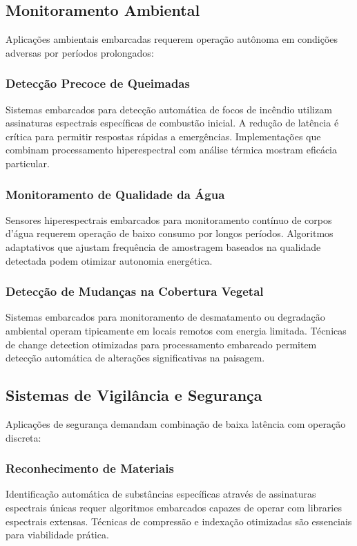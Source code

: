 \subsection{Monitoramento Ambiental}
Aplicações ambientais embarcadas requerem operação autônoma em condições adversas por períodos prolongados:

\subsubsection{Detecção Precoce de Queimadas}
Sistemas embarcados para detecção automática de focos de incêndio utilizam assinaturas espectrais específicas de combustão inicial. A redução de latência é crítica para permitir respostas rápidas a emergências. Implementações que combinam processamento hiperespectral com análise térmica mostram eficácia particular.

\subsubsection{Monitoramento de Qualidade da Água}
Sensores hiperespectrais embarcados para monitoramento contínuo de corpos d'água requerem operação de baixo consumo por longos períodos. Algoritmos adaptativos que ajustam frequência de amostragem baseados na qualidade detectada podem otimizar autonomia energética.

\subsubsection{Detecção de Mudanças na Cobertura Vegetal}
Sistemas embarcados para monitoramento de desmatamento ou degradação ambiental operam tipicamente em locais remotos com energia limitada. Técnicas de change detection otimizadas para processamento embarcado permitem detecção automática de alterações significativas na paisagem.

\subsection{Sistemas de Vigilância e Segurança}
Aplicações de segurança demandam combinação de baixa latência com operação discreta:

\subsubsection{Reconhecimento de Materiais}
Identificação automática de substâncias específicas através de assinaturas espectrais únicas requer algoritmos embarcados capazes de operar com libraries espectrais extensas. Técnicas de compressão e indexação otimizadas são essenciais para viabilidade prática.

